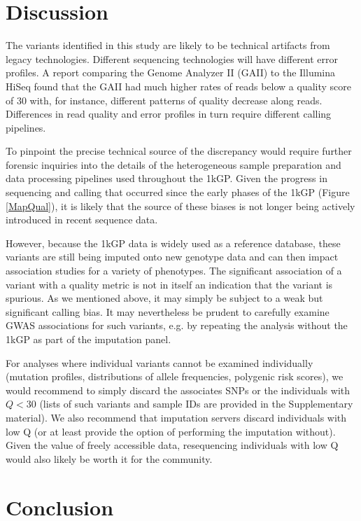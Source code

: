 \documentclass[9pt,lineno]{elife}
\begin{document}
\section{Discussion}

The variants identified in this study are likely to be technical artifacts from legacy technologies.
Different sequencing technologies will have different error profiles. 
A report comparing the Genome Analyzer II (GAII) to the Illumina HiSeq found that the GAII had much higher rates of reads below a quality score of 30 \citep{Minoche2011} with, for instance, different patterns of quality decrease along reads. 
Differences in read quality and error profiles in turn require different calling pipelines.
 
To pinpoint the precise technical source of the discrepancy would require further forensic inquiries into the details of the heterogeneous sample preparation and data processing pipelines used throughout the 1kGP. Given the progress in sequencing and calling that occurred since the early phases of the 1kGP (Figure \ref{MapQual}), it is likely that the source of these biases is not longer being actively introduced in recent sequence data.

However, because the 1kGP data is widely used as a reference database, these variants are still being imputed onto new genotype data and can then impact association studies for a variety of phenotypes. The significant association of a variant with a quality metric is not in itself an indication that the variant is spurious. As we mentioned above, it may simply be subject to a weak but significant calling bias. It may nevertheless be prudent to carefully examine GWAS associations for such variants, e.g. by repeating the analysis without the 1kGP as part of the imputation panel. 

For analyses where individual variants cannot be examined individually (mutation profiles, distributions of allele frequencies, polygenic risk scores), we would recommend to simply discard the associates SNPs or the individuals with $Q<30$ (lists of such variants and sample IDs are provided in the Supplementary material). We also recommend that imputation servers discard individuals with low Q (or at least provide the option of performing the imputation without). Given the value of freely accessible data, resequencing individuals with low Q would  also likely be worth it for the community. 

\section{Conclusion}
\end{document}
